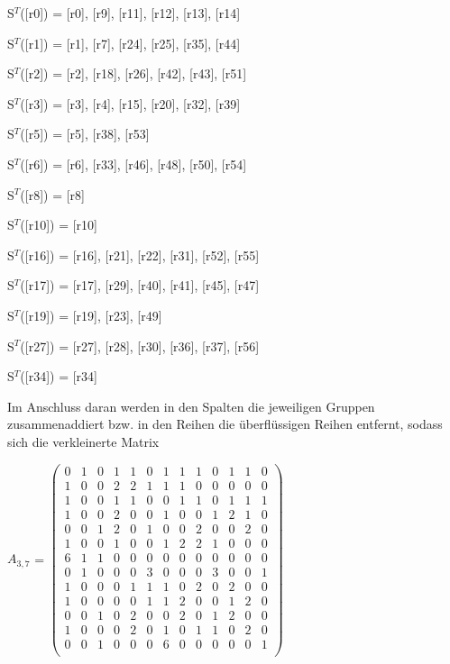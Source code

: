 \documentclass[12pt, titlepage]{article}
\begin{document}
\begin{description}
\item S$^T$([r0]) = {[r0], [r9], [r11], [r12], [r13], [r14]}
\item S$^T$([r1]) = {[r1], [r7], [r24], [r25], [r35], [r44]}
\item S$^T$([r2]) = {[r2], [r18], [r26], [r42], [r43], [r51]}
\item S$^T$([r3]) = {[r3], [r4], [r15], [r20], [r32], [r39]}
\item S$^T$([r5]) = {[r5], [r38], [r53]}
\item S$^T$([r6]) = {[r6], [r33], [r46], [r48], [r50], [r54]}
\item S$^T$([r8]) = {[r8]}
\item S$^T$([r10]) = {[r10]}
\item S$^T$([r16]) = {[r16], [r21], [r22], [r31], [r52], [r55]}
\item S$^T$([r17]) = {[r17], [r29], [r40], [r41], [r45], [r47]}
\item S$^T$([r19]) = {[r19], [r23], [r49]}
\item S$^T$([r27]) = {[r27], [r28], [r30], [r36], [r37], [r56]}
\item S$^T$([r34]) = {[r34]}
\end{description}



\newpage
Im Anschluss daran werden in den Spalten die jeweiligen Gruppen zusammenaddiert bzw. in den Reihen die überflüssigen Reihen entfernt, sodass sich die verkleinerte Matrix

\begin{center}
\item
$A_{3,7}$ = 		
$
\begin{pmatrix}
	0 & 1 & 0 & 1 & 1 & 0 & 1 & 1 & 1 & 0 & 1 & 1 & 0 \\
	1 & 0 & 0 & 2 & 2 & 1 & 1 & 1 & 0 & 0 & 0 & 0 & 0 \\
	1 & 0 & 0 & 1 & 1 & 0 & 0 & 1 & 1 & 0 & 1  &1 & 1 \\
	1 & 0 & 0 & 2 & 0 & 0 & 1 & 0 & 0 & 1 & 2 & 1 & 0 \\
	0 & 0 & 1 & 2 & 0 & 1 & 0 & 0 & 2 & 0 & 0 & 2 & 0 \\
	1 & 0 & 0 & 1 & 0 & 0 & 1 & 2 & 2 & 1 & 0 & 0 & 0 \\
	6 & 1 & 1 & 0 & 0 & 0 & 0 & 0 & 0 & 0 & 0 & 0 & 0 \\
	0 & 1 & 0 & 0 & 0 & 3 & 0 & 0 & 0 & 3 & 0 & 0 & 1 \\
	1 & 0 & 0 & 0 & 1 & 1 & 1 & 0 & 2 & 0 & 2 & 0 & 0 \\
	1 & 0 & 0 & 0 & 0 & 1 & 1 & 2 & 0 & 0 & 1 & 2 & 0 \\
	0 & 0 & 1 & 0 & 2 & 0 & 0 & 2 & 0 & 1 & 2 & 0 & 0 \\
	1 & 0 & 0 & 0 & 2 & 0 & 1 & 0 & 1 & 1 & 0 & 2 & 0 \\
	0 & 0 & 1 & 0 & 0 & 0 & 6 & 0 & 0 & 0 & 0 & 0 & 1 \\
\end{pmatrix}
$
\end{center}
\end{document}
